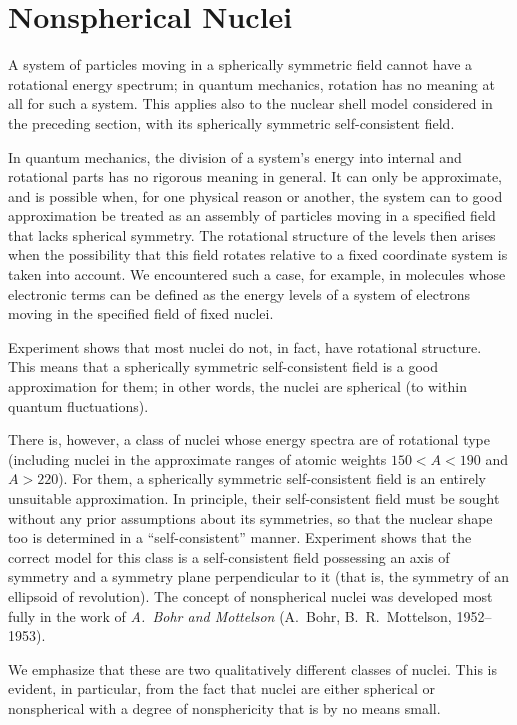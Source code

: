 \section{Nonspherical Nuclei}

A system of particles moving in a spherically symmetric field cannot have a rotational energy spectrum; in quantum mechanics, rotation has no meaning at all for such a system. This applies also to the nuclear shell model considered in the preceding section, with its spherically symmetric self-consistent field.

In quantum mechanics, the division of a system's energy into internal and rotational parts has no rigorous meaning in general. It can only be approximate, and is possible when, for one physical reason or another, the system can to good approximation be treated as an assembly of particles moving in a specified field that lacks spherical symmetry. The rotational structure of the levels then arises when the possibility that this field rotates relative to a fixed coordinate system is taken into account. We encountered such a case, for example, in molecules whose electronic terms can be defined as the energy levels of a system of electrons moving in the specified field of fixed nuclei.

Experiment shows that most nuclei do not, in fact, have rotational structure. This means that a spherically symmetric self-consistent field is a good approximation for them; in other words, the nuclei are spherical (to within quantum fluctuations).

There is, however, a class of nuclei whose energy spectra are of rotational type (including nuclei in the approximate ranges of atomic weights $150<A<190$ and $A>220$). For them, a spherically symmetric self-consistent field is an entirely unsuitable approximation. In principle, their self-consistent field must be sought without any prior assumptions about its symmetries, so that the nuclear shape too is determined in a ``self-consistent'' manner. Experiment shows that the correct model for this class is a self-consistent field possessing an axis of symmetry and a symmetry plane perpendicular to it (that is, the symmetry of an ellipsoid of revolution). The concept of nonspherical nuclei was developed most fully in the work of \emph{A.~Bohr and Mottelson} (A.~Bohr, B.~R.~Mottelson, 1952--1953).

We emphasize that these are two qualitatively different classes of nuclei. This is evident, in particular, from the fact that nuclei are either spherical or nonspherical with a degree of nonsphericity that is by no means small.

